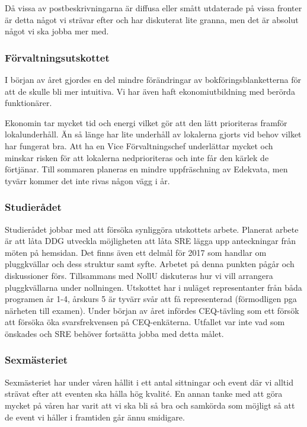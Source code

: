 \documentclass[../_main/handlingar.tex]{subfiles}
\begin{document}
Då vissa av postbeskrivningarna är diffusa eller smått utdaterade på vissa fronter är detta något vi strävar efter och har diskuterat lite granna, men det är absolut något vi ska jobba mer med.

\subsubsection*{Förvaltningsutskottet}
I början av året gjordes en del mindre förändringar av bokföringsblanketterna för att de skulle bli mer intuitiva. Vi har även haft ekonomiutbildning med berörda funktionärer.

Ekonomin tar mycket tid och energi vilket gör att den lätt prioriteras framför lokalunderhåll. Än så länge har lite underhåll av lokalerna gjorts vid behov vilket har fungerat bra. Att ha en Vice Förvaltningschef underlättar mycket och minskar risken för att lokalerna nedprioriteras och inte får den kärlek de förtjänar. Till sommaren planeras en mindre uppfräschning av Edekvata, men tyvärr kommer det inte rivas någon vägg i år.

\subsubsection*{Studierådet}
Studierådet jobbar med att försöka synliggöra utskottets arbete. Planerat arbete är att låta DDG utveckla möjligheten att låta SRE lägga upp anteckningar från möten på hemsidan. Det finns även ett delmål för 2017 som handlar om pluggkvällar och dess struktur samt syfte. Arbetet på denna punkten pågår och diskussioner förs. Tillsammans med NollU diskuteras hur vi vill arrangera pluggkvällarna under nollningen. Utskottet har i nuläget representanter från båda programen år 1-4, årskurs 5 är tyvärr svår att få representerad (förmodligen pga närheten till examen). Under början av året infördes CEQ-tävling som ett försök att försöka öka svarsfrekvensen på CEQ-enkäterna. Utfallet var inte vad som önskades och SRE behöver fortsätta jobba med detta målet.

\subsubsection*{Sexmästeriet}
Sexmästeriet har under våren hållit i ett antal sittningar och event där vi alltid strävat efter att eventen ska hålla hög kvalité. En annan tanke med att göra mycket på våren har varit att vi ska bli så bra och samkörda som möjligt så att de event vi håller i framtiden går ännu smidigare.
\end{document}
